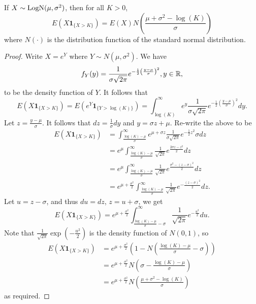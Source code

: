 \documentclass[11pt,fleqn]{book} %
\begin{document}
\begin{lemma} \label{lemma:4110}
If \(X \sim \operatorname{LogN}(\mu, \sigma^2)\), then for all \(K > 0\),
\[
E(X \mathbf{1}_{\{X > K\}}) = E(X)N\left(\frac{\mu + \sigma^2 - \log(K)}{\sigma}\right)
\]
where \(N(\cdot)\) is the distribution function of the standard normal distribution.
\end{lemma}
\begin{proof}
Write \(X = e^Y\) where \(Y \sim N(\mu, \sigma^2)\). We have
\[
f_Y(y) = \frac{1}{\sigma\sqrt{2\pi}}e^{-\frac12\left(\frac{y - \mu}{\sigma}\right)^2}, y \in \mathbb{R},
\]
to be the density function of \(Y\). It follows that
\[
E(X\mathbf{1}_{\{X > K\}}) = E(e^Y\mathbf{1}_{\{Y > \log(K)\}}) = \int_{\log(K)}^\infty e^y\frac{1}{\sigma\sqrt{2\pi}}e^{-\frac12\left(\frac{y - \mu}{\sigma}\right)^2}dy.
\]
\indent Let \(z = \frac{y - \mu}{\sigma}\). It follows that \(dz = \frac1\sigma dy\) and \(y = \sigma z + \mu\). Re-write the above to be
\[
\begin{aligned}
E(X\mathbf{1}_{\{X > K\}}) &= \int_{\frac{\log(K) - \mu}{\sigma}}^\infty e^{\mu + \sigma z}\frac{1}{\sigma\sqrt{2\pi}}e^{-\frac12 z^2}\sigma dz \\
&= e^\mu\int_{\frac{\log(K) - \mu}{\sigma}}^\infty \frac{1}{\sqrt{2\pi}}e^{\frac{2\sigma z - z^2}{2}} dz \\
&= e^\mu\int_{\frac{\log(K) - \mu}{\sigma}}^\infty \frac{1}{\sqrt{2\pi}}e^{\frac{\sigma^2 - (z - \sigma)^2}{2}} dz \\
&= e^{\mu + \frac{\sigma^2}{2}} \int_{\frac{\log(K) - \mu}{\sigma}}^\infty \frac{1}{\sqrt{2\pi}}e^{-\frac{(z - \sigma)^2}{2}} dz.
\end{aligned}
\]
\indent Let \(u = z - \sigma\), and thus \(du = dz\), \(z = u + \sigma\), we get
\[
E(X \mathbf{1}_{\{X > K\}}) = e^{\mu + \frac{\sigma^2}{2}}\int_{\frac{\log(K) - \mu}{\sigma} - \sigma}^\infty \frac{1}{\sqrt{2\pi}}e^{-\frac{u^2}{2}}du.
\]
\indent Note that \(\frac{1}{\sqrt{2\pi}}\exp\left(-\frac{u^2}{2}\right)\) is the density function of \(N(0, 1)\), so
\[
\begin{aligned}
E(X\mathbf{1}_{\{X > K\}}) &= e^{\mu + \frac{\sigma^2}{2}}\left(1 - N\left(\frac{\log(K) - \mu}{\sigma} - \sigma\right)\right) \\
&= e^{\mu + \frac{\sigma^2}{2}}N\left(\sigma - \frac{\log(K) - \mu}{\sigma}\right) \\
&= e^{\mu + \frac{\sigma^2}{2}}N\left(\frac{\mu + \sigma^2 - \log(K)}{\sigma}\right)
\end{aligned}
\]
as required.
\end{proof}
\end{document}
